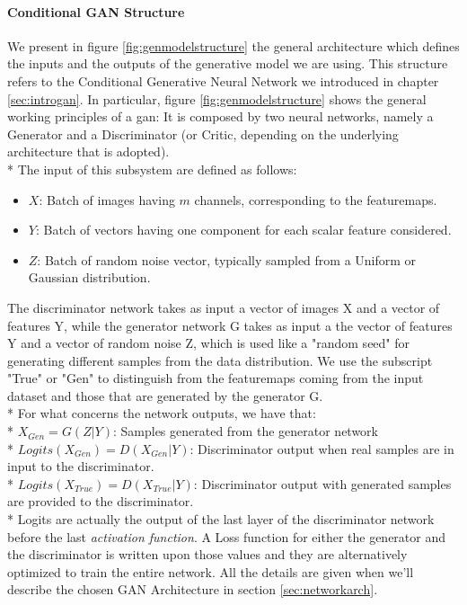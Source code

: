 \paragraph{Conditional GAN Structure} We present in figure \ref{fig:genmodelstructure} the general architecture which defines the inputs and the outputs of the generative model we are using. This structure refers to the Conditional Generative Neural Network we introduced in chapter \ref{sec:introgan}. In particular, figure \ref{fig:genmodelstructure} shows the general working principles of a \gls{gan}: It is composed by two neural networks, namely a Generator and a Discriminator (or Critic, depending on the underlying architecture that is adopted). \\* The input of this subsystem are defined as follows:
\begin{itemize}
	\item $X$: Batch of images having $m$ channels, corresponding to the \glspl{featuremap}.
	\item $Y$: Batch of vectors having one component for each scalar feature considered.
	\item $Z$: Batch of random noise vector, typically sampled from a Uniform or Gaussian distribution.
\end{itemize}

The discriminator network takes as input a vector of images X and a vector of features Y, while the generator network G takes as input a the vector of features Y and a vector of random noise Z, which is used like a "random seed" for generating different samples from the data distribution. We use the subscript "True" or "Gen" to distinguish from the \glspl{featuremap} coming from the input dataset and those that are generated by the generator G.
\\* For what concerns the network outputs, we have that:
\\* $ X_{Gen} = G(Z|Y) $: Samples generated from the generator network
\\* $ Logits(X_{Gen}) = D(X_{Gen}|Y) $: Discriminator output when real samples are in input to the discriminator.
\\* $ Logits(X_{True}) = D(X_{True}|Y) $: Discriminator output with generated samples are provided to the discriminator.
\\* Logits are actually the output of the last layer of the discriminator network before the last \textit{activation function}. A Loss function for either the generator and the discriminator is written upon those values and they are alternatively optimized to train the entire network. All the details are given when we'll describe the chosen GAN Architecture in section \ref{sec:networkarch}.


